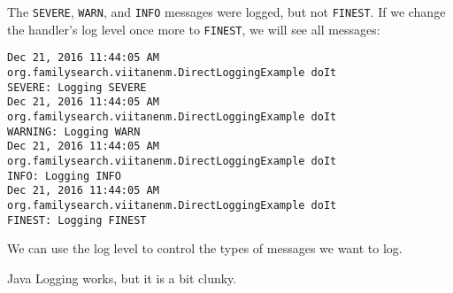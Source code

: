 The \texttt{SEVERE}, \texttt{WARN}, and \texttt{INFO} messages were logged, but not \texttt{FINEST}. If we change the handler's log level once more to \texttt{FINEST}, we will see all messages:

\begin{lstlisting}
Dec 21, 2016 11:44:05 AM org.familysearch.viitanenm.DirectLoggingExample doIt
SEVERE: Logging SEVERE
Dec 21, 2016 11:44:05 AM org.familysearch.viitanenm.DirectLoggingExample doIt
WARNING: Logging WARN
Dec 21, 2016 11:44:05 AM org.familysearch.viitanenm.DirectLoggingExample doIt
INFO: Logging INFO
Dec 21, 2016 11:44:05 AM org.familysearch.viitanenm.DirectLoggingExample doIt
FINEST: Logging FINEST

\end{lstlisting}

We can use the log level to control the types of messages we want to log.

Java Logging works, but it is a bit clunky.
